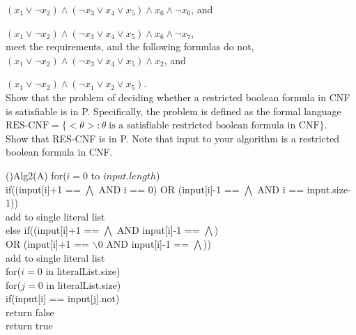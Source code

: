 \documentclass[11pt]{amsart}
\begin{document}
$(x_1 \vee \neg x_2 ) \wedge (\neg x_3 \vee x_4 \vee x_5 ) \wedge x_6 \wedge \neg x_6$, and

$(x_1 \vee \neg x_2 ) \wedge (\neg x_3 \vee x_4 \vee x_5 ) \wedge x_6 \wedge \neg x_7$, \\

meet the requirements, and the following formulas do not, \\

$(x_1 \vee \neg x_2 ) \wedge (\neg x_3 \vee x_4 \vee x_5 ) \wedge x_2$, and

$(x_1 \vee \neg x_2 ) \wedge (\neg x_1 \vee x_2 \vee x_5 )$. \\

Show that the problem of deciding whether a restricted boolean formula in CNF is satisfiable is in P. Specifically, the problem is defined as the formal language \\

$\textrm{RES-CNF} = \{ <\theta> : \theta \; \textrm{is a satisfiable restricted boolean formula in CNF} \}$. \\

Show that RES-CNF is in P. Note that input to your algorithm is a restricted boolean formula in CNF.
\smallskip\\
\begin{algorithm}[H]
    \Fn(){Alg2(A)}{
    \SetAlgoLined
    \SetNoFillComment
    \DontPrintSemicolon
    for($i = 0$ to $input.length$)\\
        \hspace{.5cm}if((input[i]+1 == $\bigwedge $ AND i == 0) OR (input[i]-1 == $\bigwedge $ AND i == input.size-1))\\
            \hspace{1cm}add to single literal list\\
            
        \hspace{.5cm}else if((input[i]+1 == $\bigwedge $ AND input[i]-1 == $\bigwedge $)\\\hspace{.75cm}OR (input[i]+1 == $\backslash 0$ AND input[i]-1 == $\bigwedge $))\\
            \hspace{1cm} add to single literal list\\
    for($i = 0$ in literalList.size)\\
        \hspace{.5cm}for($j=0$ in literalList.size)\\
            \hspace{1cm}if(input[i] == input[j].not)\\
                \hspace{1.5cm}return false\\
    return true
    }
    \end{algorithm}

    
\end{document}
